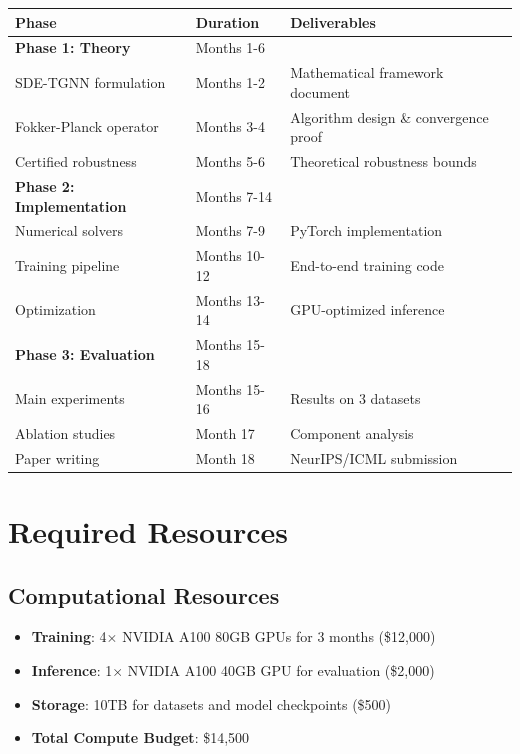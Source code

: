 \documentclass[11pt]{article}
\begin{document}
\begin{table}[h]
\centering
\small
\begin{tabular}{|l|l|l|}
\hline
\textbf{Phase} & \textbf{Duration} & \textbf{Deliverables} \\
\hline
\textbf{Phase 1: Theory} & Months 1-6 & \\
\quad SDE-TGNN formulation & Months 1-2 & Mathematical framework document \\
\quad Fokker-Planck operator & Months 3-4 & Algorithm design \& convergence proof \\
\quad Certified robustness & Months 5-6 & Theoretical robustness bounds \\
\hline
\textbf{Phase 2: Implementation} & Months 7-14 & \\
\quad Numerical solvers & Months 7-9 & PyTorch implementation \\
\quad Training pipeline & Months 10-12 & End-to-end training code \\
\quad Optimization & Months 13-14 & GPU-optimized inference \\
\hline
\textbf{Phase 3: Evaluation} & Months 15-18 & \\
\quad Main experiments & Months 15-16 & Results on 3 datasets \\
\quad Ablation studies & Month 17 & Component analysis \\
\quad Paper writing & Month 18 & NeurIPS/ICML submission \\
\hline
\end{tabular}
\end{table}

\section{Required Resources}

\subsection{Computational Resources}

\begin{itemize}
    \item \textbf{Training}: 4$\times$ NVIDIA A100 80GB GPUs for 3 months (\$12,000)
    \item \textbf{Inference}: 1$\times$ NVIDIA A100 40GB GPU for evaluation (\$2,000)
    \item \textbf{Storage}: 10TB for datasets and model checkpoints (\$500)
    \item \textbf{Total Compute Budget}: \$14,500
\end{itemize}
\end{document}
